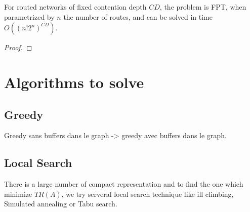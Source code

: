 \documentclass[english]{article}
\begin{document}

\begin{theorem}
For routed networks of fixed contention depth $CD$, the problem \spall is FPT, when parametrized by $n$ the number of routes,  and can be solved in time $O(( n!2^{n})^{CD})$.
\end{theorem}
\begin{proof}
\end{proof}




\section{Algorithms to solve \spall}


\subsection{Greedy}
Greedy sans buffers dans le graph -> greedy avec buffers dans le graph.

\subsection{Local Search}

There is a large number of compact representation and to find the one which minimize $TR(A)$, we try serveral local search technique like ill climbing, Simulated annealing or Tabu search.\\
\end{document}
